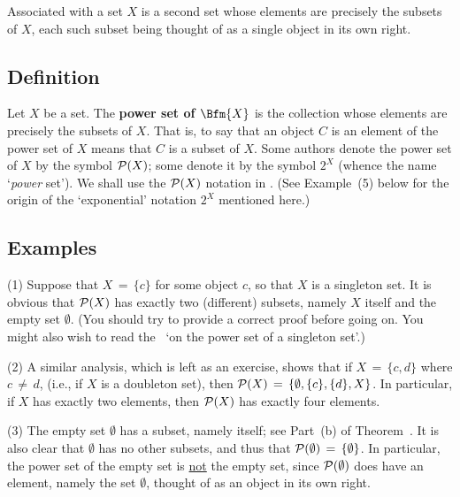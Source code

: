 {\V
\V

        Associated with a set $X$ is a second set whose elements are precisely the subsets of $X$,
    each such subset being thought of as a single object in its own right.

\V

        \subsection{\small{\bf Definition}}

        Let $X$ be a set. The {\bf power set of $\Bfm{X}$} is the collection whose elements are precisely the subsets of $X$.
    That is, to say that an object $C$ is an element of the power set of $X$ means that $C$ is a subset of $X$.
    Some authors denote the power set of $X$ by the symbol ${\cal P}(X)$; some denote it by the symbol $2^{X}$ (whence the name `{\em power} set').
    We shall use the ${\cal P}(X)$ notation in {\TheseNotes}.
    (See Example~(5) below for the origin of the `exponential' notation $2^{X}$ mentioned here.)

\V

        \subsection{\small{\bf Examples}}

\hspace*{\parindent}
        (1) Suppose that $X \,=\, \{c\}$ for some object $c$, so that $X$ is a singleton  set.
    It is obvious that ${\cal P}(X)$ has exactly two (different) subsets, namely $X$ itself and the empty set ${\emptyset}$.
    (You should try to provide a correct proof before going on. You might also wish to read the \Note\, `on the power set of a singleton set'.)

\V

        (2) A similar analysis, which is left as an exercise, shows that if $X \,=\, \{c,d\}$ where 
$c \,{\neq}\, d$, (i.e., if $X$ is a doubleton set),
    then ${\cal P}(X) \,=\, \{{\emptyset}, \{c\}, \{d\}, X\}$.
	In particular, if $X$ has exactly two elements, then ${\cal P}(X)$ has exactly four elements.

\V

        (3) The empty set ${\emptyset}$ has a subset, namely itself; see Part~(b) of Theorem~.
    It is also clear that ${\emptyset}$ has no other subsets, and thus that ${\cal P}({\emptyset}) \,=\, \{{\emptyset}\}$.
    In particular, the power set of the empty set is \underline{not} the empty set, since ${\cal P}({\emptyset})$ does have an element, namely the set ${\emptyset}$, thought of as an object in its own right.

}
